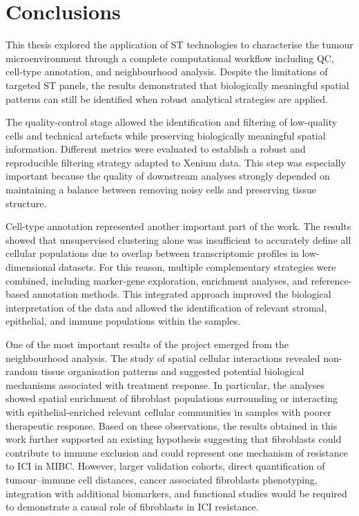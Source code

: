 \setchapterpreamble[u]{\margintoc}
\chapter{Conclusions}

This thesis explored the application of ST technologies to characterise the tumour microenvironment through a complete computational workflow including QC, cell-type annotation, and neighbourhood analysis. Despite the limitations of targeted ST panels, the results demonstrated that biologically meaningful spatial patterns can still be identified when robust analytical strategies are applied.

The quality-control stage allowed the identification and filtering of low-quality cells and technical artefacts while preserving biologically meaningful spatial information. Different metrics were evaluated to establish a robust and reproducible filtering strategy adapted to Xenium data. This step was especially important because the quality of downstream analyses strongly depended on maintaining a balance between removing noisy cells and preserving tissue structure.

Cell-type annotation represented another important part of the work. The results showed that unsupervised clustering alone was insufficient to accurately define all cellular populations due to overlap between transcriptomic profiles in low-dimensional datasets. For this reason, multiple complementary strategies were combined, including marker-gene exploration, enrichment analyses, and reference-based annotation methods. This integrated approach improved the biological interpretation of the data and allowed the identification of relevant stromal, epithelial, and immune populations within the samples.

One of the most important results of the project emerged from the neighbourhood analysis. The study of spatial cellular interactions revealed non-random tissue organisation patterns and suggested potential biological mechanisms associated with treatment response. In particular, the analyses showed spatial enrichment of fibroblast populations surrounding or interacting with epithelial-enriched relevant cellular communities in samples with poorer therapeutic response. Based on these observations, the results obtained in this work further supported an existing hypothesis suggesting that fibroblasts could contribute to immune exclusion and could represent one mechanism of resistance to ICI in MIBC. However, larger validation cohorts, direct quantification of tumour–immune cell distances, cancer associated fibroblasts phenotyping, integration with additional biomarkers, and functional studies would be required to demonstrate a causal role of fibroblasts in ICI resistance.

